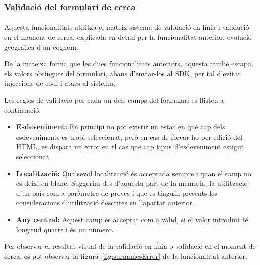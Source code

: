 \subsubsection{Validació del formulari de cerca}

\paragraph{}
Aquesta funcionalitat, utilitza el mateix sistema de validació en línia i validació en el moment de cerca, explicada en detall per la funcionalitat anterior, evolució geogràfica d’un cognom.

De la mateixa forma que les dues funcionalitats anteriors, aquesta també escapa els valors obtinguts del formulari, abans d’enviar-los al SDK, per tal d'evitar injeccions de codi i atacs al sistema.

Les regles de validació per cada un dels camps del formulari es llisten a continuació:

\begin{itemize}
    \item \textbf{Esdeveniment:} En principi no pot existir un estat en què cap dels esdeveniments es trobi seleccionat, però en cas de forcar-ho per edició del HTML, es dispara un error en el cas que cap tipus d'esdeveniment estigui seleccionat.
    \item \textbf{Localització:} Qualsevol localització és acceptada sempre i quan el camp no es deixi en blanc. Suggerim des d'aquesta part de la memòria, la utilització d’un país com a paràmetre de proves i que es tinguin presents les consideracions d'utilització descrites en l’apartat anterior.
    \item \textbf{Any central:} Aquest camp és acceptat com a vàlid, si el valor introduït té longitud quatre i és un número.
\end{itemize}

Per observar el resultat visual de la validació en línia o validació en el moment de cerca, es pot observar la figura~\ref{fig:surnamesError} de la funcionalitat anterior.

